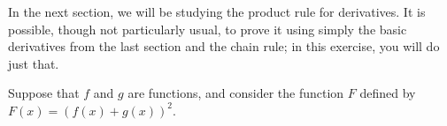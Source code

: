 \begin{questions}
  \questioS In the next section, we will be studying the product rule for derivatives. It is possible, though not
            particularly usual, to prove it using simply the basic derivatives from the last section and the chain
            rule; in this exercise, you will do just that.

            Suppose that $ f $ and $ g $ are functions, and consider the function $ F $ defined by $ F(x) = \left(f(x) + g(x)\right)^2 $.
\end{questions}

